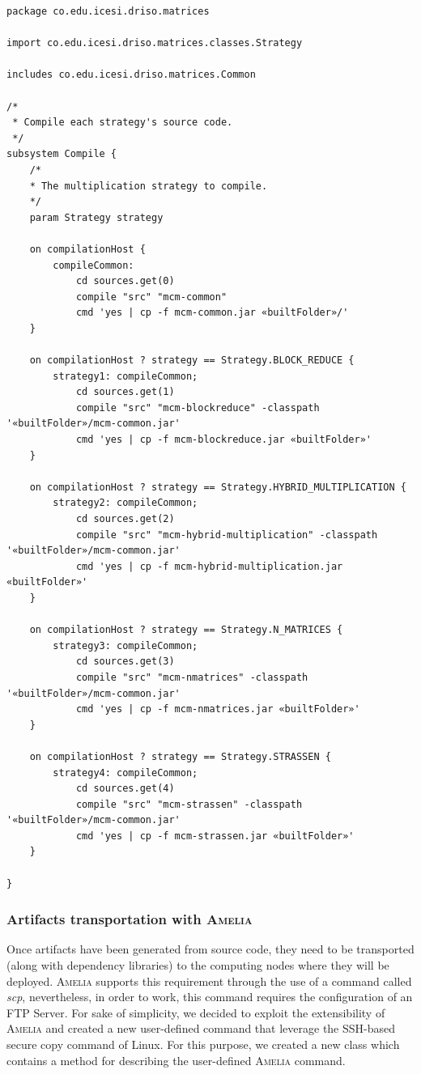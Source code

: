 \documentclass{article}
\newcommand\amelia[0]{\textsc{Amelia}}
\begin{document}
\begin{lstlisting}[style=amelia,caption=Subsystem \textit{Compile} for compiling the source code.]
package co.edu.icesi.driso.matrices

import co.edu.icesi.driso.matrices.classes.Strategy

includes co.edu.icesi.driso.matrices.Common

/*
 * Compile each strategy's source code.
 */
subsystem Compile {
    /*
    * The multiplication strategy to compile.
    */
	param Strategy strategy

	on compilationHost {	 
		compileCommon:
			cd sources.get(0)
			compile "src" "mcm-common"
			cmd 'yes | cp -f mcm-common.jar «builtFolder»/'
	}

	on compilationHost ? strategy == Strategy.BLOCK_REDUCE {
		strategy1: compileCommon;
			cd sources.get(1)
			compile "src" "mcm-blockreduce" -classpath '«builtFolder»/mcm-common.jar'
			cmd 'yes | cp -f mcm-blockreduce.jar «builtFolder»'
	}

	on compilationHost ? strategy == Strategy.HYBRID_MULTIPLICATION {
		strategy2: compileCommon;
			cd sources.get(2)
			compile "src" "mcm-hybrid-multiplication" -classpath '«builtFolder»/mcm-common.jar'
			cmd 'yes | cp -f mcm-hybrid-multiplication.jar «builtFolder»'
	}

	on compilationHost ? strategy == Strategy.N_MATRICES {
		strategy3: compileCommon;
			cd sources.get(3)
			compile "src" "mcm-nmatrices" -classpath '«builtFolder»/mcm-common.jar'
			cmd 'yes | cp -f mcm-nmatrices.jar «builtFolder»'
	}

	on compilationHost ? strategy == Strategy.STRASSEN {
		strategy4: compileCommon;
			cd sources.get(4)
			compile "src" "mcm-strassen" -classpath '«builtFolder»/mcm-common.jar'
			cmd 'yes | cp -f mcm-strassen.jar «builtFolder»'
	}

}

\end{lstlisting}

\subsubsection{Artifacts transportation with \amelia{}}

Once artifacts have been generated from source code, they need to be transported (along with dependency libraries) to the computing nodes where they will be deployed. \amelia{} supports this requirement through the use of a command called \textit{scp}, nevertheless, in order to work, this command requires the configuration of an FTP Server. For sake of simplicity, we decided to exploit the extensibility of \amelia{} and created a new user-defined command that leverage the SSH-based secure copy command of Linux. For this purpose, we created a new class which contains a method for describing the user-defined \amelia{} command. \\
\end{document}
